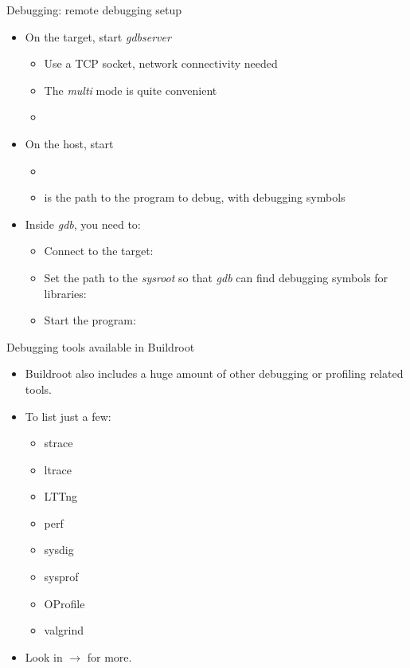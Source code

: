 \begin{frame}{Debugging: remote debugging setup}
  \begin{itemize}
  \item On the target, start {\em gdbserver}
    \begin{itemize}
    \item Use a TCP socket, network connectivity needed
    \item The {\em multi} mode is quite convenient
    \item {}
    \end{itemize}
  \item On the host, start 
    \begin{itemize}
    \item {}
    \item {} is the path to the program to debug, with
      debugging symbols
    \end{itemize}
  \item Inside {\em gdb}, you need to:
    \begin{itemize}
    \item Connect to the target:\\
    \item Set the path to the {\em sysroot} so that {\em gdb} can find debugging symbols for libraries:\\
    \item Start the program:\\
    \end{itemize}
  \end{itemize}
\end{frame}

\begin{frame}{Debugging tools available in Buildroot}
  \begin{itemize}
  \item Buildroot also includes a huge amount of other debugging or
    profiling related tools.
  \item To list just a few:
    \begin{itemize}
    \item strace
    \item ltrace
    \item LTTng
    \item perf
    \item sysdig
    \item sysprof
    \item OProfile
    \item valgrind
    \end{itemize}
  \item Look in  $\rightarrow$  for more.
  \end{itemize}
\end{frame}

